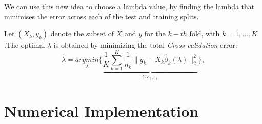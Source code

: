 \documentclass[12pt]{report}
\begin{document}
We can use this new idea to choose a lambda value, by finding the lambda that minimises the error across each of the test and training splits.

Let $(X_{k},y_{k})$ denote the subset of $X$ and $y$ for the $k-th$ fold, with $k=1,\dots, K$.The optimal $\lambda$ is obtained by minimizing the total \textit{Cross-validation} error: 
\begin{equation}
	\hat{\lambda}=\underset{\lambda}{argmin}\bigg\{\underbrace{\frac{1}{K} \sum_{k=1}^{K}\frac{1}{n_{k}}\parallel y_{k}-X_{k}\hat{\beta}_{k}(\lambda)\parallel_{2}^{2}}_{CV_{(K)}} \bigg\},
	\label{f42}
\end{equation}
\section{Numerical Implementation}
\end{document}
